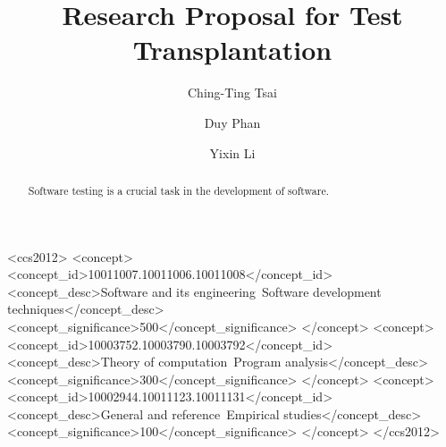 \documentclass[sigconf]{acmart}
\begin{document}
\title{Research Proposal for Test Transplantation}

\author{Ching-Ting Tsai}

\author{Duy Phan}

\author{Yixin Li}


\renewcommand{\shortauthors}{Trovato et al.}

\begin{abstract}
  Software testing is a crucial task in the development of software.
\end{abstract}

\begin{CCSXML}
<ccs2012>
  <concept>
  <concept_id>10011007.10011006.10011008</concept_id>
  <concept_desc>Software and its engineering~Software development techniques</concept_desc>
  <concept_significance>500</concept_significance>
  </concept>
  <concept>
  <concept_id>10003752.10003790.10003792</concept_id>
  <concept_desc>Theory of computation~Program analysis</concept_desc>
  <concept_significance>300</concept_significance>
  </concept>
  <concept>
  <concept_id>10002944.10011123.10011131</concept_id>
  <concept_desc>General and reference~Empirical studies</concept_desc>
  <concept_significance>100</concept_significance>
  </concept>
</ccs2012>
\end{CCSXML}
\end{document}
